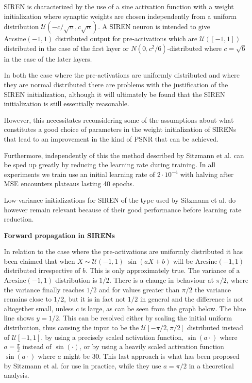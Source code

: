 \documentclass{letter}
\begin{document}

SIREN is characterized by the use of a sine activation function with a weight initialization where synaptic weights are chosen independently from a uniform distribution $\mathcal{U}(-c/\sqrt{n},c\sqrt{n})$. A SIREN neuron is intended to give $\text{Arcsine}(-1,1)$ distributed output for pre-activations which are $\mathcal{U}([-1,1])$ distributed in the case of the first layer or $N(0, c^2/6)$-distributed where $c=\sqrt{6}$ in the case of the later layers.

In both the case where the pre-activations are uniformly distributed and where they are normal distributed there are problems with the justification of the SIREN initialization, although it will ultimately be found that the SIREN initialization is still essentially reasonable.

However, this necessitates reconsidering some of the assumptions about what constitutes a good choice of parameters in the weight initialization of SIRENs that lead to an improvement in the kind of PSNR that can be achieved.

Furthermore, independently of this the method described by Sitzmann et al. can be sped up greatly by reducing the learning rate during training. In all experiments we train use an initial learning rate of $2\cdot 10^{-4}$ with halving after MSE encounters plateaus lasting 40 epochs.

Low-variance initializations for SIREN of the type used by Sitzmann et al. do however remain relevant because of their good performance before learning rate reduction.

{\bf Forward propagation in SIRENs}

In relation to the case where the pre-activations are uniformly distributed it has been claimed that when $X\sim \mathcal{U}(-1,1)$ $\sin(aX+b)$ will be $\text{Arcsine}(-1,1)$ distributed irrespective of $b$. This is only approximately true. The variance of a $\text{Arcsine}(-1,1)$ distribution is $1/2$. There is a change in behaviour at $\pi/2$, where the variance finally reaches $1/2$ and for values greater than $\pi/2$ the variance remains close to $1/2$, but it is in fact not $1/2$  in general and the difference is not altogether small, unless $c$ is large, as can be seen from the graph below. The blue line shows $y=1/2$. This can be resolved either by scaling the initial uniform distribution, thus causing the input to be the $\mathcal{U}[-\pi/2,\pi/2]$ distributed instead of $\mathcal{U}[-1,1]$, by using a precisely scaled activation function, $\sin(a\cdot)$ where $a=\frac{\pi}{2}$ instead of $\sin(\cdot)$, or by using a heavily scaled activation function $\sin(a\cdot)$ where $a$ might be $30$. This last approach is what has been proposed by Sitzmann et al. for use in practice, while they use $a=\pi/2$ in a theoretical analysis.
\end{document}
